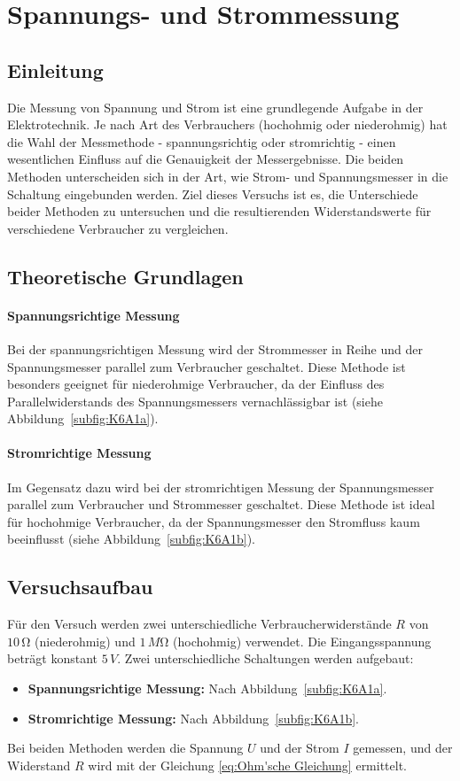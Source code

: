 \section{Spannungs- und Strommessung}
\subsection{Einleitung}
Die Messung von Spannung und Strom ist eine grundlegende Aufgabe in der Elektrotechnik. Je nach Art des Verbrauchers (hochohmig oder niederohmig) hat die Wahl der Messmethode - spannungsrichtig oder stromrichtig - einen wesentlichen Einfluss auf die Genauigkeit der Messergebnisse. Die beiden Methoden unterscheiden sich in der Art, wie Strom- und Spannungsmesser in die Schaltung eingebunden werden. Ziel dieses Versuchs ist es, die Unterschiede beider Methoden zu untersuchen und die resultierenden Widerstandswerte für verschiedene Verbraucher zu vergleichen.

\subsection{Theoretische Grundlagen}
\paragraph{Spannungsrichtige Messung}
Bei der spannungsrichtigen Messung wird der Strommesser in Reihe und der Spannungsmesser parallel zum Verbraucher geschaltet. Diese Methode ist besonders geeignet für niederohmige Verbraucher, da der Einfluss des Parallelwiderstands des Spannungsmessers vernachlässigbar ist (siehe Abbildung~\ref{subfig:K6A1a}).

\paragraph{Stromrichtige Messung}
Im Gegensatz dazu wird bei der stromrichtigen Messung der Spannungsmesser parallel zum Verbraucher und Strommesser geschaltet. Diese Methode ist ideal für hochohmige Verbraucher, da der Spannungsmesser den Stromfluss kaum beeinflusst (siehe Abbildung~\ref{subfig:K6A1b}).

\subsection{Versuchsaufbau}
Für den Versuch werden zwei unterschiedliche Verbraucherwiderstände \( R \) von \( 10\,\unit{\ohm} \) (niederohmig) und \( 1\,\unit{M\ohm} \) (hochohmig) verwendet. Die Eingangsspannung beträgt konstant \( 5\,\unit{V} \). Zwei unterschiedliche Schaltungen werden aufgebaut:
\begin{itemize}
    \item \textbf{Spannungsrichtige Messung:} Nach Abbildung~\ref{subfig:K6A1a}.
    \item \textbf{Stromrichtige Messung:} Nach Abbildung~\ref{subfig:K6A1b}.
\end{itemize}
Bei beiden Methoden werden die Spannung \( U \) und der Strom \( I \) gemessen, und der Widerstand \( R \) wird mit der Gleichung \eqref{eq:Ohm'sche Gleichung} ermittelt.


